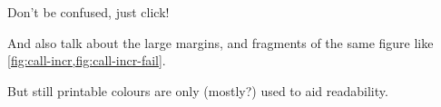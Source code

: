 Don't be confused, just click!

And also talk about the large margins, and fragments of the same figure like
\cref{fig:call-incr,fig:call-incr-fail}.

But still printable \textemdash{} colours are only (mostly?) used to aid readability.

\endgroup


\cleardoubleevenemptypage{}


\begingroup %

\hypersetup{allcolors=.}

\setlength{\textheight}{230\vscale} %

\etocstandarddisplaystyle%
\etocstandardlines%
\setcounter{tocdepth}{\sectiontocdepth} %

\tableofcontents %

\setcounter{tocdepth}{\subsectiontocdepth} %




\endgroup
{}
